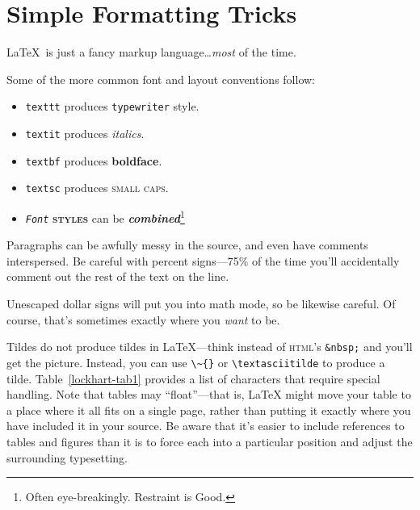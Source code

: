 \documentclass[final]{ols}
\begin{document}
\section{Simple Formatting Tricks}

\LaTeX\ is just a fancy markup language\ldots \textit{most} of the
time.

Some of the more common font and layout conventions follow:
\begin{itemize}
\item \texttt{texttt} produces \texttt{typewriter} style.
\item \texttt{textit} produces \textit{italics}.
\item \texttt{textbf} produces \textbf{boldface}.
\item \texttt{textsc} produces \textsc{small caps}.
\item \texttt{\textit{Font}} \textbf{\textsc{styles}} can be
      \textit{\textbf{combined}}\footnote{Often eye-breakingly. Restraint is Good.}
\end{itemize}

Paragraphs
   can  be      awfully messy
in the source, and even
have comments interspersed.  Be careful with %
percent signs---75\% of the time you'll accidentally comment out the
rest of the text on the line.

Unescaped dollar signs will put you into math mode, so be likewise
careful.  Of course, that's sometimes exactly where you \textit{want}
to be.

Tildes do not produce tildes in \LaTeX ---think instead of
\textsc{html}'s \texttt{\&nbsp;} and you'll get the picture.  Instead,
you can use \texttt{{\textbackslash}{\~{}}\{\}} or
\texttt{{\textbackslash}textasciitilde} to produce a tilde.  
Table~\ref{lockhart-tab1} provides a list of characters that require
special handling.  Note that tables may ``float''---that is, {\LaTeX}
might move your table to a place where it all fits on a single page,
rather than putting it exactly where you have included it in your
source.  Be aware that it's easier to include references to tables and
figures than it is to force each into a particular position and adjust
the surrounding typesetting.
%
\end{document}
